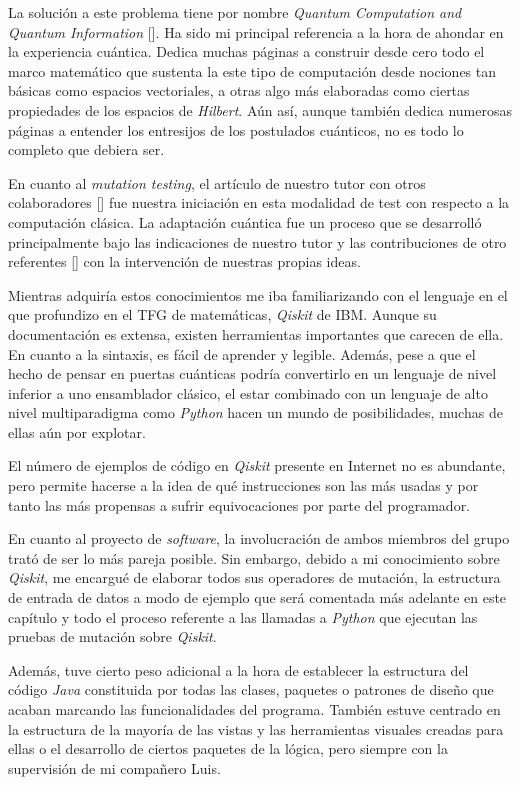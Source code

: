 La solución a este problema tiene por nombre \textit{Quantum Computation and Quantum Information} [\cite{nielsen2001quantum}]. Ha sido mi principal referencia a la hora de ahondar en la experiencia cuántica. Dedica muchas páginas a construir desde cero todo el marco matemático que sustenta la este tipo de computación desde nociones tan básicas como espacios vectoriales, a otras algo más elaboradas como ciertas propiedades de los espacios de \textit{Hilbert}. Aún así, aunque también dedica numerosas páginas a entender los entresijos de los postulados cuánticos, no es todo lo completo que debiera ser.

En cuanto al \textit{mutation testing}, el artículo de nuestro tutor con otros colaboradores [\cite{hierons2010mutation}] fue nuestra iniciación en esta modalidad de test con respecto a la computación clásica. La adaptación cuántica fue un proceso que se desarrolló principalmente bajo las indicaciones de nuestro tutor y las contribuciones de otro referentes [\cite{usaolaquantum}] con la intervención de nuestras propias ideas.

Mientras adquiría estos conocimientos me iba familiarizando con el lenguaje en el que profundizo en el TFG de matemáticas, \textit{Qiskit} de IBM. Aunque su documentación es extensa, existen herramientas importantes que carecen de ella. En cuanto a la sintaxis, es fácil de aprender y legible. Además, pese a que el hecho de pensar en puertas cuánticas podría convertirlo en un lenguaje de nivel inferior a uno ensamblador clásico, el estar combinado con un lenguaje de alto nivel multiparadigma como \textit{Python} hacen un mundo de posibilidades, muchas de ellas aún por explotar.

El número de ejemplos de código en \textit{Qiskit} presente en Internet no es abundante, pero permite hacerse a la idea de qué instrucciones son las más usadas y por tanto las más propensas a sufrir equivocaciones por parte del programador.

En cuanto al proyecto de \textit{software}, la involucración de ambos miembros del grupo trató de ser lo más pareja posible. Sin embargo, debido a mi conocimiento sobre \textit{Qiskit}, me encargué de elaborar todos sus operadores de mutación, la estructura de entrada de datos a modo de ejemplo que será comentada más adelante en este capítulo y todo el proceso referente a las llamadas a \textit{Python} que ejecutan las pruebas de mutación sobre \textit{Qiskit}.

Además, tuve cierto peso adicional a la hora de establecer la estructura del código \textit{Java}  constituida por todas las clases, paquetes o patrones de diseño que acaban marcando las funcionalidades del programa. También estuve centrado en la estructura de la mayoría de las vistas y las herramientas visuales creadas para ellas o el desarrollo de ciertos paquetes de la lógica, pero siempre con la supervisión de mi compañero Luis.

